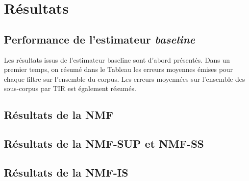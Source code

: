 \section{Résultats}

\subsection{Performance de l'estimateur \textit{baseline}}

Les résultats issus de l'estimateur baseline sont d'abord présentés. Dans un premier temps, on résumé dans le Tableau les erreurs moyennes émises pour chaque filtre sur l'ensemble du corpus. Les erreurs moyennées sur l'ensemble des sous-corpus par TIR est également résumés. 

\begin{table}[]
\centering
\caption{Erreur XXX de l'estimateur \textit{baseline} selon $f_c$ sur l'ensemble du corpus \textit{Ambiance} et pour chaque TIR}
\label{tab:resuls_ambiance_filtre}
\end{table}


\subsection{Résultats de la NMF}

\subsection{Résultats de la NMF-SUP et NMF-SS}

\subsection{Résultats de la NMF-IS}


